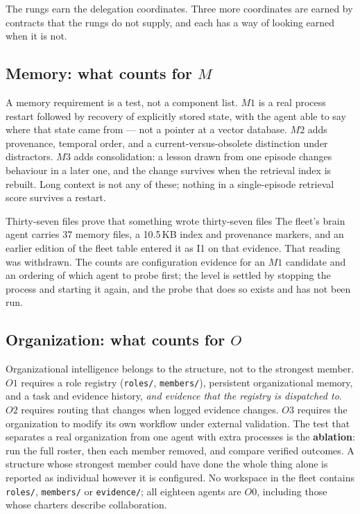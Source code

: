 The rungs earn the delegation coordinates. Three more coordinates are earned by contracts that the rungs do not supply, and each has a way of looking earned when it is not.

\subsection{Memory: what counts for $M$}

A memory requirement is a test, not a component list. $M1$ is a real process restart followed by recovery of explicitly stored state, with the agent able to say where that state came from --- not a pointer at a vector database. $M2$ adds provenance, temporal order, and a current-versus-obsolete distinction under distractors. $M3$ adds consolidation: a lesson drawn from one episode changes behaviour in a later one, and the change survives when the retrieval index is rebuilt. Long context is not any of these; nothing in a single-episode retrieval score survives a restart.

\begin{cautionbox}{Thirty-seven files prove that something wrote thirty-seven files}
The fleet's brain agent carries 37 memory files, a 10.5\,KB index and provenance markers, and an earlier edition of the fleet table entered it as I1 on that evidence. That reading was withdrawn. The counts are configuration evidence for an $M1$ candidate and an ordering of which agent to probe first; the level is settled by stopping the process and starting it again, and the probe that does so exists and has not been run.
\end{cautionbox}

\subsection{Organization: what counts for $O$}

Organizational intelligence belongs to the structure, not to the strongest member. $O1$ requires a role registry (\texttt{roles/}, \texttt{members/}), persistent organizational memory, and a task and evidence history, \emph{and evidence that the registry is dispatched to}. $O2$ requires routing that changes when logged evidence changes. $O3$ requires the organization to modify its own workflow under external validation. The test that separates a real organization from one agent with extra processes is the \textbf{ablation}: run the full roster, then each member removed, and compare verified outcomes. A structure whose strongest member could have done the whole thing alone is reported as individual however it is configured. No workspace in the fleet contains \texttt{roles/}, \texttt{members/} or \texttt{evidence/}; all eighteen agents are $O0$, including those whose charters describe collaboration.

